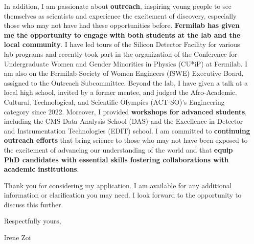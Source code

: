 {\begin{flushleft}

In addition, I am passionate about {\bf outreach}, inspiring young people to see themselves as scientists and experience the excitement of discovery, especially those who may not have had these opportunities before. {\bf Fermilab has given me the opportunity to engage with both students at the lab and the local community}. I have led tours of the Silicon Detector Facility for various lab programs and recently took part in the organization of the Conference for Undergraduate Women and Gender Minorities in Physics (CU*iP) at Fermilab. I am also on the Fermilab Society of Women Engineers (fSWE) Executive Board, assigned to the Outreach Subcommittee. Beyond the lab, I have given a talk at a local high school, invited by a former mentee, and judged the Afro-Academic, Cultural, Technological, and Scientific Olympics (ACT-SO)’s Engineering category since 2022. Moreover, I  provided {\bf workshops for advanced students}, including the CMS Data Analysis School (DAS) and the Excellence in Detector and Instrumentation Technologies (EDIT) school. I am committed to {\bf continuing outreach efforts} that bring science to those who may not have been exposed to the excitement of advancing our understanding of the world and that {\bf equip PhD candidates with essential skills fostering collaborations with academic institutions}.

Thank you for considering my application. I am available for any additional information or clarification you may need. I look forward to the opportunity to discuss this further.

Respectfully yours,

Irene Zoi
\end{flushleft}

}